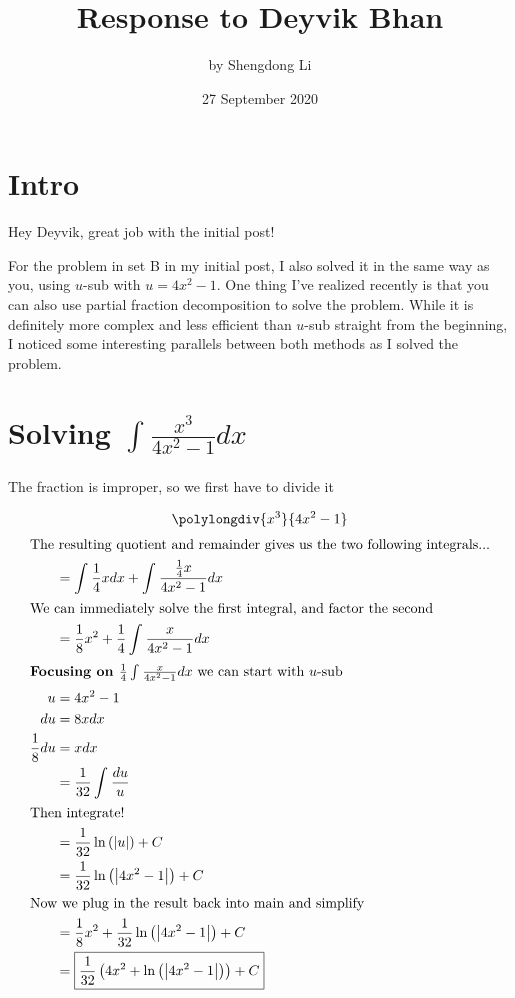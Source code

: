 \documentclass[12pt]{article}
\begin{document}
\title{Response to Deyvik Bhan}
\author{by Shengdong Li}
\date{27 September 2020}
\maketitle

\section{Intro}
Hey Deyvik, great job with the initial post!

For the problem in set B in my initial post, I also solved it in the same way as you, using $u$-sub with $u=4x^2-1$. One thing I've realized recently is that you can also use partial fraction decomposition to solve the problem. While it is definitely more complex and less efficient than $u$-sub straight from the beginning, I noticed some interesting parallels between both methods as I solved the problem.


\section{Solving $\int_{ }^{ }\frac{x^{3}}{4x^{2}-1}dx$}
The fraction is improper, so we first have to divide it

\begin{equation}
  \polylongdiv{x^3}{4x^2-1}
\end{equation}
\begin{align}
  \intertext{The resulting quotient and remainder gives us the two following integrals...}
  &=\int_{ }^{ }\frac{1}{4}xdx+\int_{ }^{ }\frac{\frac{1}{4}x}{4x^{2}-1}dx\\
  \intertext{We can immediately solve the first integral, and factor the second}
  &=\frac{1}{8}x^{2}+\frac{1}{4}\int_{ }^{ }\frac{x}{4x^{2}-1}dx\\
  \intertext{\textbf{Focusing on $\frac{1}{4}\int_{ }^{ }\frac{x}{4x^{2}-1}dx$} we can start with $u$-sub}
  u&=4x^{2}-1\\
  du&=8xdx\\
  \frac{1}{8}du&=xdx\\
  &=\frac{1}{32}\int_{ }^{ }\frac{du}{u}\\
  \intertext{Then integrate!}
  &=\frac{1}{32}\ln\left(\left|u\right|\right)+C\\
  &=\frac{1}{32}\ln\left(\left|4x^{2}-1\right|\right)+C\\
  \intertext{Now we plug in the result back into main and simplify}
  &=\frac{1}{8}x^{2}+\frac{1}{32}\ln\left(\left|4x^{2}-1\right|\right)+C\\
  &=\boxed{\frac{1}{32}\left(4x^{2}+\ln\left(\left|4x^{2}-1\right|\right)\right)+C}
\end{align}
\end{document}
